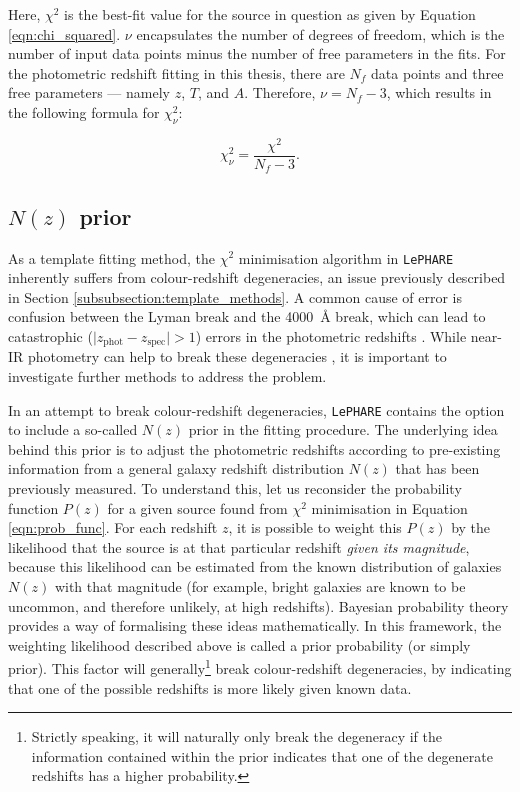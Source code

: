 \noindent Here, $\chi^2$ is the best-fit value for the source in question as given by Equation \ref{eqn:chi_squared}. $\nu$ encapsulates the number of degrees of freedom, which is the number of input data points minus the number of free parameters in the fits. For the photometric redshift fitting in this thesis, there are $N_{f}$ data points and three free parameters --- namely $z$, $T$, and $A$. Therefore, $\nu =  N_{f} - 3$, which results in the following formula for $\chi^2_{\nu}$:

\begin{equation}
    \chi^2_{\nu} = \frac{\chi^2}{N_{f}-3}. \label{eqn:red_chi_squared}
\end{equation}


\subsection{\texorpdfstring{$N(z)$}{TEXT} prior}\label{subsection:prior}
As a template fitting method, the $\chi^2$ minimisation algorithm in \texttt{LePHARE} inherently suffers from colour-redshift degeneracies, an issue previously described in Section \ref{subsubsection:template_methods}. A common cause of error is confusion between the Lyman break and the \SI{4000}{\angstrom} break, which can lead to catastrophic ($\lvert z_{\mathrm{phot}}-z_{\mathrm{spec}} \rvert>1$) errors in the photometric redshifts \citep{2006A&A...457..841I}. While near-IR photometry can help to break these degeneracies \citep{2000ApJ...536..571B,2006A&A...457..841I}, it is important to investigate further methods to address the problem. \par


In an attempt to break colour-redshift degeneracies, \texttt{LePHARE} contains the option to include a so-called $N(z)$ prior in the fitting procedure. The underlying idea behind this prior is to adjust the photometric redshifts according to pre-existing information from a general galaxy redshift distribution $N(z)$ that has been previously measured. To understand this, let us reconsider the probability function $P(z)$ for a given source found from $\chi^2$ minimisation in Equation \ref{eqn:prob_func}. For each redshift $z$, it is possible to weight this $P(z)$ by the likelihood that the source is at that particular redshift \textit{given its magnitude}, because this likelihood can be estimated from the known distribution of galaxies $N(z)$ with that magnitude (for example, bright galaxies are known to be uncommon, and therefore unlikely, at high redshifts). Bayesian probability theory provides a way of formalising these ideas mathematically. In this framework, the weighting likelihood described above is called a prior probability (or simply prior). This factor will generally\footnote{Strictly speaking, it will naturally only break the degeneracy if the information contained within the prior indicates that one of the degenerate redshifts has a higher probability.} break colour-redshift degeneracies, by indicating that one of the possible redshifts is more likely given known data. \par


